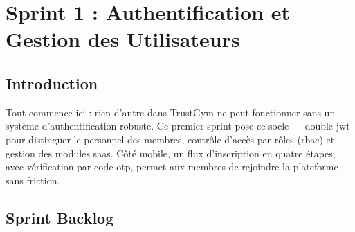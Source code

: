 ﻿\documentclass[../main.tex]{subfiles}
\begin{document}
\chapter{Sprint 1 : Authentification et Gestion des Utilisateurs}

\section{Introduction}

Tout commence ici : rien d'autre dans TrustGym ne peut fonctionner sans un syst\`{e}me d'authentification robuste. Ce premier sprint pose ce socle --- double \acrshort{jwt} pour distinguer le personnel des membres, contr\^{o}le d'acc\`{e}s par r\^{o}les (\acrshort{rbac}) et gestion des modules \acrshort{saas}. C\^{o}t\'{e} mobile, un flux d'inscription en quatre \'{e}tapes, avec v\'{e}rification par code \acrshort{otp}, permet aux membres de rejoindre la plateforme sans friction.

\section{Sprint Backlog}
\end{document}
